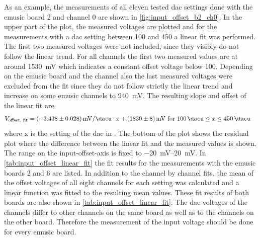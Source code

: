 As an example, the measurements of all eleven tested \ac{dac} settings done with the \ac{emusic} board 2 and channel 0 are shown in \autoref{fig:input_offset_b2_ch0}.
In the upper part of the plot, the measured voltages are plotted and for the measurements with a \ac{dac} setting between \SI{100}{\dacu} and \SI{450}{\dacu} a linear fit was performed.
The first two measured voltages were not included, since they visibly do not follow the linear trend.
For all channels the first two measured values are at around \SI{1530}{\milli\volt} which indicates a constant offset voltage below \SI{100}{\adcu}.
Depending on the \ac{emusic} board and the channel also the last measured voltages were excluded from the fit since they do not follow strictly the linear trend and increase on some \ac{emusic} channels to \SI{940}{\milli\volt}.
The resulting slope and offset of the linear fit are
\begin{align}
	V_\text{offset, fit} &= \SI{-3.438(28)}{\milli\volt\per\dacu}\cdot x+\SI{1830(8)}{\milli\volt}\text{ for }\SI{100}{\dacu}\leq x\leq\SI{450}{\dacu}
\end{align}
where x is the setting of the \ac{dac} in \si{\dacu}.
The bottom of the plot shows the residual plot where the difference between the linear fit and the measured values is shown.
The range on the input-offset-axis is fixed to \SIrange{-20}{20}{\milli\volt}.
In \autoref{tab:input_offset_linear_fit} the fit results for the measurements with the \ac{emusic} boards 2 and 6 are listed.
In addition to the channel by channel fits, the mean of the offset voltages of all eight channels for each setting was calculated and a linear function was fitted to the resulting mean values.
These fit results of both boards are also shown in \autoref{tab:input_offset_linear_fit}.
The \ac{dac} voltages of the channels differ to other channels on the same board as well as to the channels on the other board.
Therefore the measurement of the input voltage should be done for every \ac{emusic} board.
